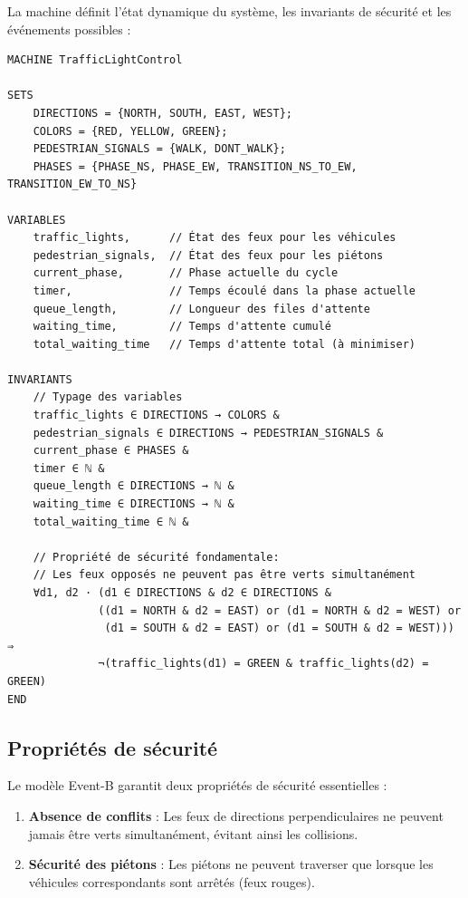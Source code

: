 \documentclass[11pt,a4paper]{article}
\begin{document}
La machine définit l'état dynamique du système, les invariants de sécurité et les événements possibles :

\begin{lstlisting}[style=EventB, caption=Extrait de la machine Event-B]
MACHINE TrafficLightControl

SETS
    DIRECTIONS = {NORTH, SOUTH, EAST, WEST};
    COLORS = {RED, YELLOW, GREEN};
    PEDESTRIAN_SIGNALS = {WALK, DONT_WALK};
    PHASES = {PHASE_NS, PHASE_EW, TRANSITION_NS_TO_EW, TRANSITION_EW_TO_NS}

VARIABLES
    traffic_lights,      // État des feux pour les véhicules
    pedestrian_signals,  // État des feux pour les piétons
    current_phase,       // Phase actuelle du cycle
    timer,               // Temps écoulé dans la phase actuelle
    queue_length,        // Longueur des files d'attente
    waiting_time,        // Temps d'attente cumulé
    total_waiting_time   // Temps d'attente total (à minimiser)

INVARIANTS
    // Typage des variables
    traffic_lights ∈ DIRECTIONS → COLORS &
    pedestrian_signals ∈ DIRECTIONS → PEDESTRIAN_SIGNALS &
    current_phase ∈ PHASES &
    timer ∈ ℕ &
    queue_length ∈ DIRECTIONS → ℕ &
    waiting_time ∈ DIRECTIONS → ℕ &
    total_waiting_time ∈ ℕ &
    
    // Propriété de sécurité fondamentale:
    // Les feux opposés ne peuvent pas être verts simultanément
    ∀d1, d2 · (d1 ∈ DIRECTIONS & d2 ∈ DIRECTIONS & 
              ((d1 = NORTH & d2 = EAST) or (d1 = NORTH & d2 = WEST) or
               (d1 = SOUTH & d2 = EAST) or (d1 = SOUTH & d2 = WEST))) ⇒
              ¬(traffic_lights(d1) = GREEN & traffic_lights(d2) = GREEN)
END
\end{lstlisting}

\subsection{Propriétés de sécurité}
\label{subsec:securite}

Le modèle Event-B garantit deux propriétés de sécurité essentielles :

\begin{enumerate}
    \item \textbf{Absence de conflits} : Les feux de directions perpendiculaires ne peuvent jamais être verts simultanément, évitant ainsi les collisions.
    \item \textbf{Sécurité des piétons} : Les piétons ne peuvent traverser que lorsque les véhicules correspondants sont arrêtés (feux rouges).
\end{enumerate}
\end{document}
